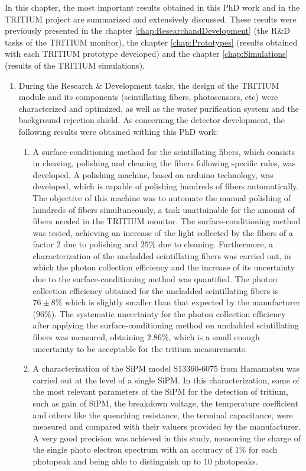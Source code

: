 In this chapter, the most important results obtained in this PhD work and in the TRITIUM project are summarized and extensively discussed. These results were previously presented in the chapter \ref{chap:ResearchandDevelopment} (the R\&D tasks of the TRITIUM monitor), the chapter \ref{chap:Prototypes} (results obtained with each TRITIUM prototype developed) and the chapter \ref{chap:Simulations} (results of the TRITIUM simulations).


\begin{enumerate}
\item{} During the Research \& Development tasks, the design of the TRITIUM module and its components (scintillating fibers, photosensors, etc) were characterized and optimized, as well as the water purification system and the background rejection shield. As concerning the detector development, the following results were obtained withing this PhD work:

\begin{enumerate}
\item{} A surface-conditioning method for the scintillating fibers, which consists in cleaving, polishing and cleaning the fibers following specific rules, was developed. A polishing machine, based on arduino technology, was developed, which is capable of polishing hundreds of fibers automatically. The objective of this machine was to automate the manual polishing of hundreds of fibers simultaneously, a task unattainable for the amount of fibers needed in the TRITIUM monitor. The surface-conditioning method was tested, achieving an increase of the light collected by the fibers of a factor 2 due to polishing and $25\%$ due to cleaning. Furthermore, a characterization of the uncladded scintillating fibers was carried out, in which the photon collection efficiency and the increase of its uncertainty due to the surface-conditioning method was quantified. The photon collection efficiency obtained for the uncladded scintillating fibers is $76\pm 8\%$ which is slightly smaller than that expected by the manufacturer ($96\%$). The systematic uncertainty for the photon collection efficiency after applying the surface-conditioning method on uncladded scintillating fibers was measured, obtaining $2.86\%$, which is a small enough uncertainty to be acceptable for the tritium measurements.

\item{} A characterization of the SiPM model S13360-6075 from Hamamatsu was carried out at the level of a single SiPM. In this characterization, some of the most relevant parameters of the SiPM for the detection of tritium, such as gain of SiPM, the breakdown voltage, the temperature coefficient and others like the quenching resistance, the terminal capacitance, were measured and compared with their valuers provided by the manufacturer. A very good precision was achieved in this study, measuring the charge of the single photo electron spectrum with an accuracy of $1\%$ for each photopeak and being ablo to distinguish up to $10$ photopeaks. %


\end{enumerate}
\end{enumerate}

